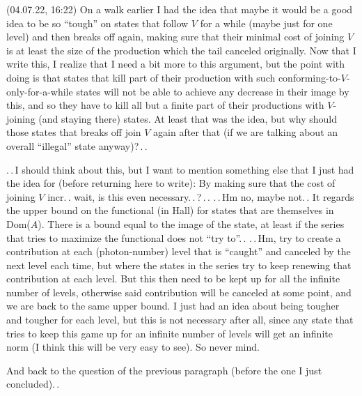 \documentclass{report}
\begin{document}
(04.07.22, 16:22) On a walk earlier I had the idea that maybe it would be a good idea to be so ``tough'' on states that follow $V$ for a while (maybe just for one level) and then breaks off again, making sure that their minimal cost of joining $V$ is at least the size of the production which the tail canceled originally. Now that I write this, I realize that I need a bit more to this argument, but the point with doing is that states that kill part of their production with such conforming-to-$V$-only-for-a-while states will not be able to achieve any decrease in their image by this, and so they have to kill all but a finite part of their productions with $V$-joining (and staying there) states. At least that was the idea, but why should those states that breaks off join $V$ again after that (if we are talking about an overall ``illegal'' state anyway)?\,.\,. 

.\,.\,I should think about this, but I want to mention something else that I just had the idea for (before returning here to write): By making sure that the cost of joining $V$ incr.\,. wait, is this even necessary.\,.\,?\,.\,. %
.\,.\,Hm no, maybe not.\,. It regards the upper bound on the functional (in Hall) for states that are themselves in Dom($A$). There is a bound equal to the image of the state, at least if the series that tries to maximize the functional does not ``try to''.\,. .\,.\,Hm, try to create a contribution at each (photon-number) level that is ``caught'' and canceled by the next level each time, but where the states in the series try to keep renewing that contribution at each level. But this then need to be kept up for all the infinite number of levels, otherwise said contribution will be canceled at some point, and we are back to the same upper bound. I just had an idea about being tougher and tougher for each level, but this is not necessary after all, since any state that tries to keep this game up for an infinite number of levels will get an infinite norm (I think this will be very easy to see). So never mind. %

And back to the question of the previous paragraph (before the one I just concluded).\,. 
\end{document}
